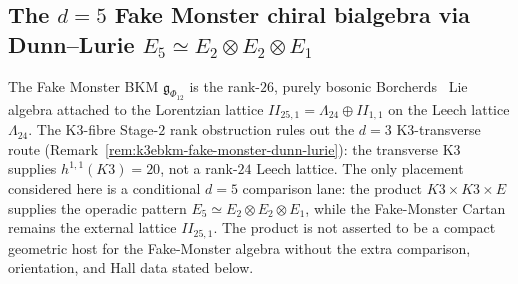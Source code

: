 \subsection{The \texorpdfstring{$d = 5$}{d = 5} Fake Monster chiral bialgebra via Dunn--Lurie \texorpdfstring{$E_5 \simeq E_2 \otimes E_2 \otimes E_1$}{E5 = E2 tensor E2 tensor E1}}
\label{subsec:fake-monster-d5-bialgebra}

The Fake Monster BKM $\mathfrak{g}_{\Phi_{12}}$ is the rank-$26$, purely bosonic Borcherds~\cite{Borcherds1990Adv} Lie algebra attached to the Lorentzian lattice $II_{25,1}=\Lambda_{24}\oplus II_{1,1}$ on the Leech lattice $\Lambda_{24}$. The K3-fibre Stage-$2$ rank obstruction rules out the $d=3$ K3-transverse route (Remark~\ref{rem:k3ebkm-fake-monster-dunn-lurie}): the transverse K3 supplies \(h^{1,1}(K3)=20\), not a rank-$24$ Leech lattice. The only placement considered here is a conditional $d=5$ comparison lane: the product \(K3\times K3\times E\) supplies the operadic pattern \(E_5\simeq E_2\otimes E_2\otimes E_1\), while the Fake-Monster Cartan remains the external lattice \(II_{25,1}\). The product is not asserted to be a compact geometric host for the Fake-Monster algebra without the extra comparison, orientation, and Hall data stated below.

